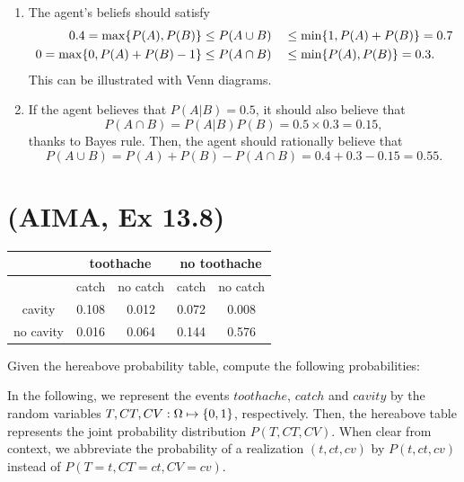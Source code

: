 \documentclass[11pt, a4paper]{article}
\begin{document}
\begin{solution}
    \begin{enumerate}
        \item The agent's beliefs should satisfy
        \begin{alignat*}{2}
            0.4 = \max \{P(A), P(B)\} & \leq P(A \cup B) && \leq \min \{1, P(A) + P(B)\} = 0.7 \\
            0 = \max \{0, P(A) + P(B) - 1\} & \leq P(A \cap B) && \leq \min \{P(A), P(B)\} = 0.3 .
        \end{alignat*}
        This can be illustrated with Venn diagrams.

        \item If the agent believes that $P(A | B) = 0.5$, it should also believe that
        \begin{equation*}
            P(A \cap B) = P(A | B) P(B) = 0.5 \times 0.3 = 0.15,
        \end{equation*}
        thanks to Bayes rule. Then, the agent should rationally believe that
        \begin{equation*}
            P(A \cup B) = P(A) + P(B) - P(A \cap B) = 0.4 + 0.3 - 0.15 = 0.55.
        \end{equation*}
    \end{enumerate}
\end{solution}

\newpage

\section{(AIMA, Ex 13.8)}

\begin{table}[h]
    \centering
    \begin{tabular}{|c|c|c|c|c|}
        \hline
        & \multicolumn{2}{c|}{toothache} & \multicolumn{2}{c|}{no toothache} \\ \hline
        & catch & no catch & catch & no catch \\ \hline
        cavity & 0.108 & 0.012 & 0.072 & 0.008 \\ \hline
        no cavity & 0.016 & 0.064 & 0.144 & 0.576 \\ \hline
    \end{tabular}
\end{table}

Given the hereabove probability table, compute the following probabilities:

\begin{solution}
    In the following, we represent the events $toothache$, $catch$ and $cavity$ by the random variables $T, CT, CV: \Omega \mapsto \{0, 1\}$, respectively. Then, the hereabove table represents the joint probability distribution $P(T, CT, CV)$. When clear from context, we abbreviate the probability of a realization $(t, ct, cv)$ by $P(t, ct, cv)$ instead of $P(T = t, CT = ct, CV = cv)$.
\end{solution}
\end{document}
